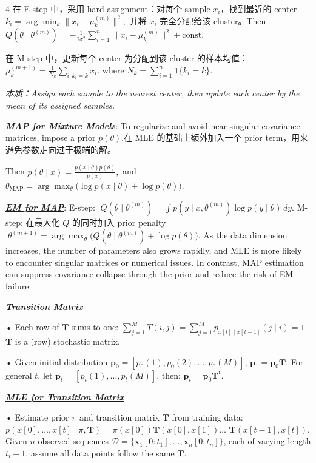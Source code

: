 \documentclass[12pt]{article}
\newcommand{\bulletPoint}[1]{\underline{\textit{\textbf{#1}}}}
\begin{document}
\begin{multicols*}{4}
在 E-step 中，采用 hard assignment：对每个 sample $x_i$，找到最近的 center
\textcolor{blue!50!black}{$\textstyle
k_i=\arg\min_k \|x_i-\mu_k^{(m)}\|^2,
$}
并将 $x_i$ 完全分配给该 cluster。Then
$Q(\theta\mid \theta^{(m)})
=
-\frac{1}{2\sigma^2}\sum_{i=1}^n \|x_i-\mu_{k_i}^{(m)}\|^2+\mathrm{const}.$

在 M-step 中，更新每个 center 为分配到该 cluster 的样本均值：
\textcolor{purple!60!black}{$\textstyle
\mu_k^{(m+1)}=\frac{1}{N_k}\sum_{i:k_i=k} x_i.
$}
where
$N_k=\sum_{i=1}^n \mathbf 1\{k_i=k\}.$

\emph{本质：Assign each sample to the nearest center, then update each center by the mean of its assigned samples.}

\bulletPoint{MAP for Mixture Models}:
To regularize and avoid near-singular covariance matrices, impose a prior $p(\theta)$.在 MLE 的基础上额外加入一个 prior term，用来避免参数走向过于极端的解。

Then
$p(\theta\mid x)=\frac{p(x\mid \theta)p(\theta)}{p(x)},$
and
$\theta_{\mathrm{MAP}}
=
\arg\max_{\theta}\bigl(\log p(x\mid \theta)+\log p(\theta)\bigr).$

\bulletPoint{EM for MAP}:
E-step:
$\;Q(\theta\mid \theta^{(m)})
=
\int p(y\mid x,\theta^{(m)})\log p(y\mid \theta)\,dy.$
M-step: 在最大化 $Q$ 的同时加入 prior penalty
$\;\theta^{(m+1)}
=
\arg\max_{\theta}
\bigl(Q(\theta\mid \theta^{(m)})+\log p(\theta)\bigr).$
As the data dimension increases, the number of parameters also grows rapidly, and MLE is more likely to encounter singular matrices or numerical issues. In contrast, MAP estimation can suppress covariance collapse through the prior and reduce the risk of EM failure.

\bulletPoint{Transition Matrix}\quad

• Each row of $\mathbf{T}$ sums to one: $\sum_{j=1}^{M} T(i, j) = \sum_{j=1}^{M} p_{x[t] \mid x[t-1]}(j \mid i) = 1$.
$\mathbf{T}$ is a (row) stochastic matrix.

• Given initial distribution $\mathbf{p}_0 = [p_0(1), p_0(2), \dots, p_0(M)]$,  $\mathbf{p}_1 = \mathbf{p}_0 \mathbf{T}$. For general $t$, let $\mathbf{p}_t = [p_t(1), \dots, p_t(M)]$, then: $\mathbf{p}_t = \mathbf{p}_0 \mathbf{T}^t$.


\bulletPoint{MLE for Transition Matrix}\quad

• Estimate prior $\pi$ and transition matrix $\mathbf{T}$ from training data:
$p(x[0], \dots, x[t] \mid \pi, \mathbf{T}) = \pi(x[0]) \mathbf{T}(x[0], x[1])  \dots$ $\mathbf{T}(x[t-1], x[t])$.
Given $n$ observed sequences $\mathcal{D} = \{\mathbf{x}_1[0:t_1], \dots, \mathbf{x}_n[0:t_n]\}$, each of varying length $t_i+1$, assume all data points follow the same $\mathbf{T}$. 


\end{multicols*}
\end{document}
